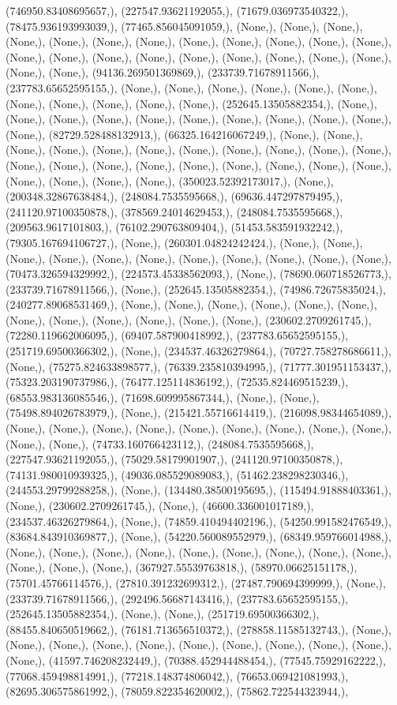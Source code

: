 \documentclass{article}
\begin{document}
(746950.83408695657,), (227547.93621192055,), (71679.036973540322,), (78475.936193993039,), (77465.856045091059,), (None,), (None,), (None,), (None,), (None,), (None,), (None,), (None,), (None,), (None,), (None,), (None,), (None,), (None,), (None,), (None,), (None,), (None,), (None,), (None,), (None,), (None,), (None,), (94136.269501369869,), (233739.71678911566,), (237783.65652595155,), (None,), (None,), (None,), (None,), (None,), (None,), (None,), (None,), (None,), (None,), (None,), (252645.13505882354,), (None,), (None,), (None,), (None,), (None,), (None,), (None,), (None,), (None,), (None,), (None,), (82729.528488132913,), (66325.164216067249,), (None,), (None,), (None,), (None,), (None,), (None,), (None,), (None,), (None,), (None,), (None,), (None,), (None,), (None,), (None,), (None,), (None,), (None,), (None,), (None,), (None,), (None,), (None,), (None,), (350023.52392173017,), (None,), (200348.32867638484,), (248084.7535595668,), (69636.447297879495,), (241120.97100350878,), (378569.24014629453,), (248084.7535595668,), (209563.9617101803,), (76102.290763809404,), (51453.583591932242,), (79305.167694106727,), (None,), (260301.04824242424,), (None,), (None,), (None,), (None,), (None,), (None,), (None,), (None,), (None,), (None,), (None,), (70473.326594329992,), (224573.45338562093,), (None,), (78690.060718526773,), (233739.71678911566,), (None,), (252645.13505882354,), (74986.72675835024,), (240277.89068531469,), (None,), (None,), (None,), (None,), (None,), (None,), (None,), (None,), (None,), (None,), (None,), (None,), (230602.2709261745,), (72280.119662006095,), (69407.587900418992,), (237783.65652595155,), (251719.69500366302,), (None,), (234537.46326279864,), (70727.758278686611,), (None,), (75275.824633898577,), (76339.235810394995,), (71777.301951153437,), (75323.203190737986,), (76477.125114836192,), (72535.824469515239,), (68553.983136085546,), (71698.609995867344,), (None,), (None,), (75498.894026783979,), (None,), (215421.55716614419,), (216098.98344654089,), (None,), (None,), (None,), (None,), (None,), (None,), (None,), (None,), (None,), (None,), (None,), (74733.160766423112,), (248084.7535595668,), (227547.93621192055,), (75029.58179901907,), (241120.97100350878,), (74131.980010939325,), (49036.085529089083,), (51462.238298230346,), (244553.29799288258,), (None,), (134480.38500195695,), (115494.91888403361,), (None,), (230602.2709261745,), (None,), (46600.336001017189,), (234537.46326279864,), (None,), (74859.410494402196,), (54250.991582476549,), (83684.843910369877,), (None,), (54220.560089552979,), (68349.959766014988,), (None,), (None,), (None,), (None,), (None,), (None,), (None,), (None,), (None,), (None,), (None,), (None,), (367927.55539763818,), (58970.06625151178,), (75701.45766114576,), (27810.391232699312,), (27487.790694399999,), (None,), (233739.71678911566,), (292496.56687143416,), (237783.65652595155,), (252645.13505882354,), (None,), (None,), (251719.69500366302,), (88455.840650519662,), (76181.713656510372,), (278858.11585132743,), (None,), (None,), (None,), (None,), (None,), (None,), (None,), (None,), (None,), (None,), (None,), (41597.746208232449,), (70388.452944488454,), (77545.75929162222,), (77068.459498814991,), (77218.148374806042,), (76653.069421081993,), (82695.306575861992,), (78059.822354620002,), (75862.722544323944,), 
\end{document}
